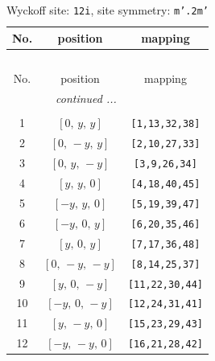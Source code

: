 \documentclass[fleqn,8pt]{jsarticle}
\begin{document}
\begin{longtable}{ccc}
\caption{Wyckoff site: {\tt 12i}, site symmetry: {\tt m'.2m'}}
 \\
 \hline \hline
No. & position & mapping \\ \hline \endfirsthead

\multicolumn{2}{l}{\tablename\ \thetable{}} \\
 \hline \hline
No. & position & mapping \\ \hline \endhead

 \hline \hline
\multicolumn{2}{r}{\footnotesize\it continued ...} \\ \endfoot

 \hline \hline
\multicolumn{2}{r}{} \\ \endlastfoot

1 & $\left[ 0,\, y,\, y \right]$ & {\tt [1,13,32,38]} \\ \hline
2 & $\left[ 0,\, - y,\, y \right]$ & {\tt [2,10,27,33]} \\ \hline
3 & $\left[ 0,\, y,\, - y \right]$ & {\tt [3,9,26,34]} \\ \hline
4 & $\left[ y,\, y,\, 0 \right]$ & {\tt [4,18,40,45]} \\ \hline
5 & $\left[ - y,\, y,\, 0 \right]$ & {\tt [5,19,39,47]} \\ \hline
6 & $\left[ - y,\, 0,\, y \right]$ & {\tt [6,20,35,46]} \\ \hline
7 & $\left[ y,\, 0,\, y \right]$ & {\tt [7,17,36,48]} \\ \hline
8 & $\left[ 0,\, - y,\, - y \right]$ & {\tt [8,14,25,37]} \\ \hline
9 & $\left[ y,\, 0,\, - y \right]$ & {\tt [11,22,30,44]} \\ \hline
10 & $\left[ - y,\, 0,\, - y \right]$ & {\tt [12,24,31,41]} \\ \hline
11 & $\left[ y,\, - y,\, 0 \right]$ & {\tt [15,23,29,43]} \\ \hline
12 & $\left[ - y,\, - y,\, 0 \right]$ & {\tt [16,21,28,42]} \\
\end{longtable}
\renewcommand{\arraystretch}{1.2}
\end{document}
